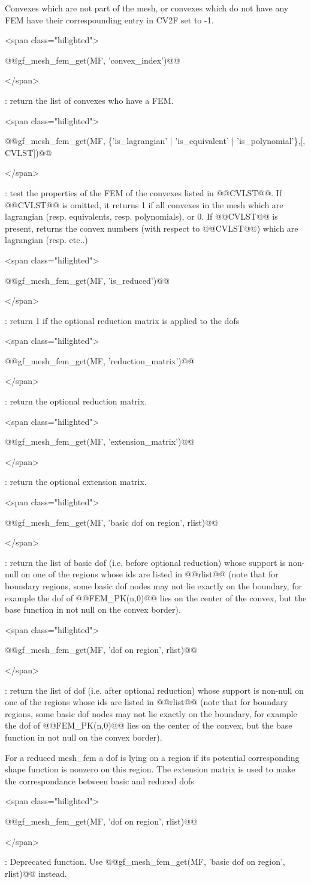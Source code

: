 \documentclass[11pt,a4paper]{article}
\newcommand{\hil}[1]{\begin{rawxml}<span class="hilighted">\end{rawxml}#1\begin{rawxml}</span>\end{rawxml}}
\newcommand{\sep}[1]{\medskip\par\hil{#1}}
\newcommand{\hil}[1]{\colorbox{sepbg}{#1}}
\newcommand{\sep}[1]{\medskip\par#1}
\begin{document}
\begin{cmddescription}
  Convexes which are not part of the mesh, or convexes which do not
  have any FEM have their correspounding entry in CV2F set to -1.

  \sep{@@gf\_mesh\_fem\_get(MF, 'convex\_index')@@} : 
  return the list of convexes who have a FEM.

  \sep{@@gf\_mesh\_fem\_get(MF, \{'is\_lagrangian' | 'is\_equivalent' |
    'is\_polynomial'\},[, CVLST])@@} :
   test
  the properties of the FEM of the convexes listed in @@CVLST@@.  If
  @@CVLST@@ is omitted, it returns 1 if all convexes in the mesh which
  are lagrangian (resp.  equivalents, resp. polynomials), or 0.  If
  @@CVLST@@ is present, returns the convex numbers (with respect to
  @@CVLST@@) which are lagrangian (resp. etc..)

  \sep{@@gf\_mesh\_fem\_get(MF, 'is\_reduced')@@} : 
  return 1 if the optional reduction matrix is applied to the dofs

  \sep{@@gf\_mesh\_fem\_get(MF, 'reduction\_matrix')@@} : 
  return the optional reduction matrix.

  \sep{@@gf\_mesh\_fem\_get(MF, 'extension\_matrix')@@} : 
  return the optional extension matrix.

  \sep{@@gf\_mesh\_fem\_get(MF, 'basic dof on region', rlist)@@} : return the
  list of basic dof (i.e. before optional reduction) whose support is
  non-null on one of the regions whose
  ids are listed in @@rlist@@ (note that for boundary regions, some
  basic dof nodes may not lie exactly on the boundary, for example the dof
  of @@FEM_PK(n,0)@@ lies on the center of the convex, but the base
  function in not null on the convex border).

  \sep{@@gf\_mesh\_fem\_get(MF, 'dof on region', rlist)@@} : return the
  list of dof (i.e. after optional reduction) whose support is
  non-null on one of the regions whose
  ids are listed in @@rlist@@ (note that for boundary regions, some
  basic dof nodes may not lie exactly on the boundary, for example the dof
  of @@FEM_PK(n,0)@@ lies on the center of the convex, but the base
  function in not null on the convex border).
  
  For a reduced mesh\_fem
  a dof is lying on a region if its potential corresponding shape
  function is nonzero on this region. The extension matrix is used
  to make the correspondance between basic and reduced dofs

  \sep{@@gf\_mesh\_fem\_get(MF, 'dof on region', rlist)@@} : Deprecated
  function. Use @@gf\_mesh\_fem\_get(MF, 'basic dof on region', rlist)@@ instead.


\end{cmddescription}
\end{document}
